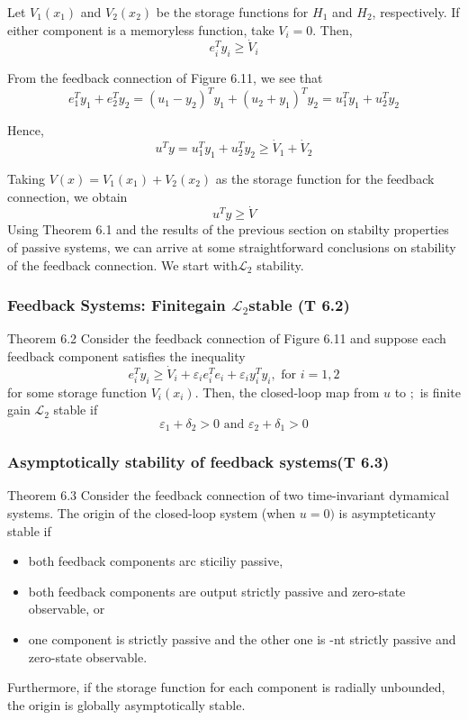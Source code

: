 \documentclass{article}
\begin{document}
\begin{frm-prf}
	Let $V_1\left(x_1\right)$ and $V_2\left(x_2\right)$ be the storage functions for $H_1$ and $H_2$, respectively. If either component is a memoryless function, take $V_i=0$. Then,
$$
e_i^T y_i \geq \dot{V}_i
$$

From the feedback connection of Figure 6.11, we see that
$$
e_1^T y_1+e_2^T y_2=\left(u_1-y_2\right)^T y_1+\left(u_2+y_1\right)^T y_2=u_1^T y_1+u_2^T y_2
$$

Hence,
$$
u^T y=u_1^T y_1+u_2^T y_2 \geq \dot{V}_1+\dot{V}_2
$$

Taking $V(x)=V_1\left(x_1\right)+V_2\left(x_2\right)$ as the storage function for the feedback connection, we obtain
$$
u^T y \geq \dot{V}
$$
Using Theorem 6.1 and the results of the previous section on stabilty properties of passive systems, we can arrive at some straightforward conclusions on stability of the feedback connection. We start with$\mathcal{L}_2$ stability.
\end{frm-prf}
\subsubsection{Feedback Systems: Finitegain $\mathcal{L}_2$stable (T 6.2)}
Theorem 6.2 Consider the feedback connection of Figure 6.11 and suppose each feedback component satisfies the inequality
$$
e_i^T y_i \geq \dot{V}_i+\varepsilon_i e_i^T e_i+\varepsilon_i y_i^T y_i, \text { for } i=1,2
$$
for some storage function $V_i\left(x_i\right)$. Then, the closed-loop map from $u$ to $;$ is finite gain $\mathcal{L}_2$ stable if
$$
\varepsilon_1+\delta_2>0 \text { and } \varepsilon_2+\delta_1>0
$$
\subsubsection{Asymptotically stability of feedback systems(T 6.3)}
Theorem 6.3 Consider the feedback connection of two time-invariant dymamical systems. The origin of the closed-loop system (when $u=0)$ is asympteticanty stable if
\begin{itemize}
	\item both feedback components arc sticiliy passive,
	\item both feedback components are output strictly passive and zero-state observable, or
	\item one component is strictly passive and the other one is -nt strictly passive and zero-state observable.
\end{itemize}
Furthermore, if the storage function for each component is radially unbounded, the origin is globally asymptotically stable.
\end{document}
